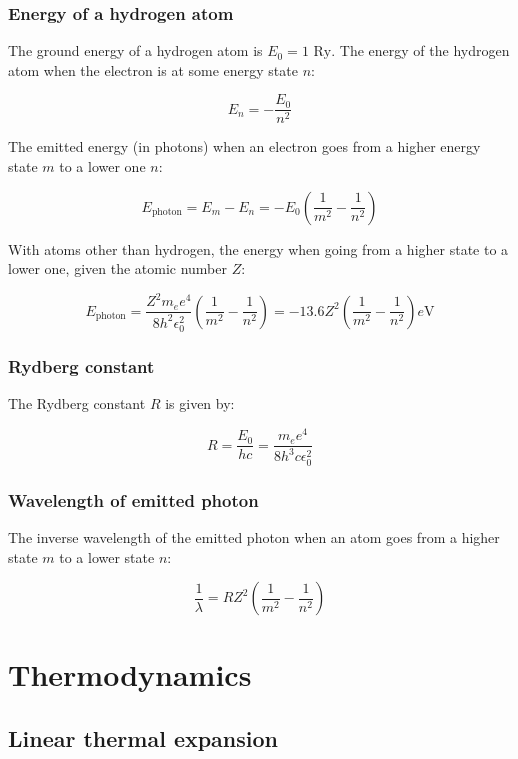 \documentclass[12pt]{article}
\begin{document}
\subsubsection{Energy of a hydrogen atom}

The ground energy of a hydrogen atom is $E_0 = 1 \text{ Ry}$. The energy of the hydrogen atom when the electron is at some energy state $n$:

\[
\boxed{
E_n = -\frac{E_0}{n^2}
}
\]

The emitted energy (in photons) when an electron goes from a higher energy state $m$ to a lower one $n$:

\[
\boxed{
E_{\text{photon}} = E_m - E_n = -E_0\left( \frac{1}{m^2} - \frac{1}{n^2} \right)
}
\]

With atoms other than hydrogen, the energy when going from a higher state to a lower one, given the atomic number $Z$:

\[
\boxed{
E_{\text{photon}} = \frac{Z^2 m_e e^4}{8 h^2 \epsilon_0^2}\left( \frac{1}{m^2} - \frac{1}{n^2} \right) = -13.6Z^2\left( \frac{1}{m^2} - \frac{1}{n^2} \right) e\text{V}
}
\]

\subsubsection{Rydberg constant}

The Rydberg constant $R$ is given by:

\[
R = \frac{E_0}{hc} = \frac{m_e e^4}{8h^3 c \epsilon_0^2}
\]

\subsubsection{Wavelength of emitted photon}

The inverse wavelength of the emitted photon when an atom goes from a higher state $m$ to a lower state $n$:

\[
\boxed{
\frac{1}{\lambda} = RZ^2\left( \frac{1}{m^2} - \frac{1}{n^2} \right)
}
\]

\newpage

\section{Thermodynamics}

\subsection{Linear thermal expansion}
\end{document}
